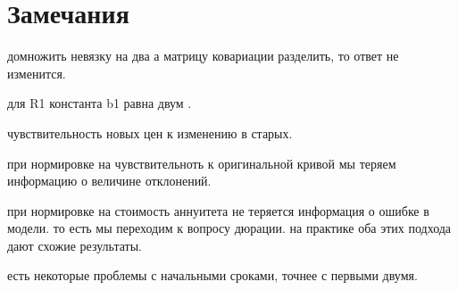 \documentclass[10pt]{article}
\theoremstyle{definition}
\theoremstyle{remark}
\theoremstyle{plain}
\begin{document}
\section{Замечания}
домножить невязку на два а матрицу ковариации разделить, то ответ не изменится.

для R1 константа b1 равна двум .

чувствительность новых цен к изменению в старых.

при нормировке на чувствительноть к оригинальной кривой мы теряем информацию о величине отклонений.

при нормировке на стоимость аннуитета не теряется информация о ошибке в модели. то есть мы переходим к вопросу дюрации. на практике оба этих подхода дают схожие результаты.

есть некоторые проблемы с начальными сроками, точнее с первыми двумя.


\newpage
{}

\end{document}
